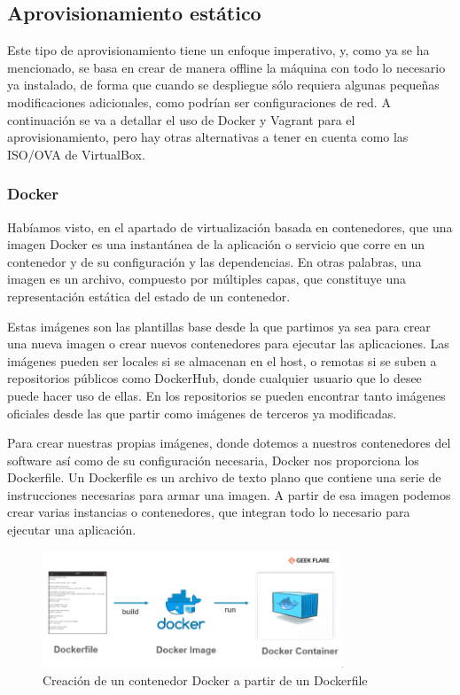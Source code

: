 \subsection{Aprovisionamiento estático} \label{sec:est}
	Este tipo de aprovisionamiento tiene un enfoque imperativo, y, como ya se ha mencionado, se basa en crear de manera offline la máquina con todo lo necesario ya instalado, de forma que cuando se despliegue sólo requiera algunas pequeñas modificaciones adicionales, como podrían ser configuraciones de red. A continuación se va a detallar el uso de Docker y Vagrant para el aprovisionamiento, pero hay otras alternativas a tener en cuenta como las ISO/OVA  de VirtualBox.

\subsubsection{Docker}
	Habíamos visto, en el apartado de virtualización basada en contenedores, que una imagen Docker es una instantánea de la aplicación o servicio que corre en un contenedor y de su configuración y las dependencias. En otras palabras, una imagen es un archivo, compuesto por múltiples capas, que constituye una representación estática del estado de un contenedor.

	Estas imágenes son las plantillas base desde la que partimos ya sea para crear una nueva imagen o crear nuevos contenedores para ejecutar las aplicaciones. Las imágenes pueden ser locales si se almacenan en el host, o remotas si se suben a repositorios públicos como DockerHub, donde cualquier usuario que lo desee puede hacer uso de ellas. En los repositorios se pueden encontrar tanto imágenes oficiales desde las que partir como imágenes de terceros ya modificadas.

	Para crear nuestras propias imágenes, donde dotemos a nuestros contenedores del software así como de su configuración necesaria, Docker nos proporciona los Dockerfile. Un Dockerfile es un archivo de texto plano que contiene una serie de instrucciones necesarias para armar una imagen. A partir de esa imagen podemos crear varias instancias o contenedores, que integran todo lo necesario para ejecutar una aplicación.

	\begin{figure}[h]
	\centering
	\includegraphics[width=0.8\textwidth]{../imgs/EdA/dockerfile.png}
	\caption{Creación de un contenedor Docker a partir de un Dockerfile}
	\label{fig:dockerfile}
	\end{figure}

